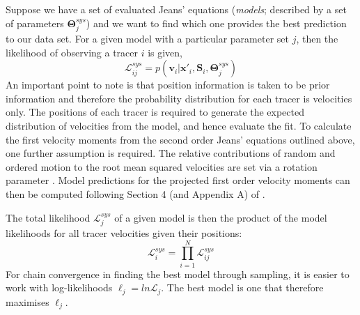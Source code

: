 Suppose we have a set of evaluated Jeans' equations (\textit{models}; described by a set of parameters $\boldsymbol{\Theta}^{sys}_{j}$) and we want to find which one provides the best prediction to our data set. For a given model with a particular parameter set $j$, then the likelihood of observing a tracer $i$ is given, 
\begin{equation}
\mathcal{L}^{sys}_{ij} = p (\boldsymbol{v}_{i}|\boldsymbol{x}'_{i},\boldsymbol{S}_{i},\boldsymbol{\Theta}^{sys}_{j})
\end{equation}
An important point to note is that position information is taken to be prior information and therefore the probability distribution for each tracer is velocities only. The positions of each tracer is required to generate the expected distribution of velocities from the model, and hence evaluate the fit. To calculate the first velocity moments from the second order Jeans' equations outlined above, one further assumption is required. The relative contributions of random and ordered motion to the root mean squared velocities are set via a rotation parameter \citep[see Equation 22 in][]{watkins2013}. Model predictions for the projected first order velocity moments can then be computed following Section 4 (and Appendix A) of \citet{watkins2013}.

The total likelihood $\mathcal{L}^{sys}_{j}$ of a given model is then the product of the model likelihoods for all tracer velocities given their positions:
\begin{equation}
\mathcal{L}^{sys}_{i} = \prod^{N}_{i=1} \mathcal{L}^{sys}_{ij}
\end{equation}
For chain convergence in finding the best model through sampling, it is easier to work with log-likelihoods $\ell_j = ln\mathcal{L}_{j}$. The best model is one that therefore maximises $\ell_j$. 

